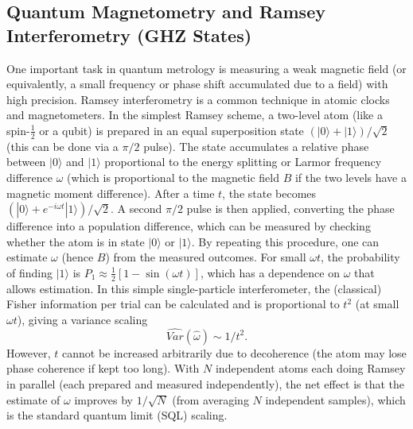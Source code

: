 \subsection{Quantum Magnetometry and Ramsey Interferometry (GHZ States)}

\label{sec:GHZ-Ramsey}



One important task in quantum metrology is measuring a weak magnetic
field (or equivalently, a small frequency or phase shift accumulated
due to a field) with high precision. Ramsey interferometry is a common
technique in atomic clocks and magnetometers. In the simplest Ramsey
scheme, a two-level atom (like a spin-$\frac{1}{2}$ or a qubit) is
prepared in an equal superposition state $(|0\rangle +
|1\rangle)/\sqrt{2}$ (this can be done via a $\pi/2$ pulse). The state
accumulates a relative phase between $|0\rangle$ and $|1\rangle$
proportional to the energy splitting or Larmor frequency difference
$\omega$ (which is proportional to the magnetic field $B$ if the two
levels have a magnetic moment difference). After a time $t$, the state
becomes $(|0\rangle + e^{-i\omega t}|1\rangle)/\sqrt{2}$. A second
$\pi/2$ pulse is then applied, converting the phase difference into a
population difference, which can be measured by checking whether the
atom is in state $|0\rangle$ or $|1\rangle$. By repeating this
procedure, one can estimate $\omega$ (hence $B$) from the measured
outcomes. For small $\omega t$, the probability of finding $|1\rangle$
is $P_1 \approx \frac{1}{2}[1 - \sin(\omega t)]$, which has a
dependence on $\omega$ that allows estimation. In this simple
single-particle interferometer, the (classical) Fisher information per
trial can be calculated and is proportional to $t^2$ (at small $\omega
t$), giving a variance scaling
\[
\widehat{Var}(\hat{\omega}) \sim 1/t^2.
\]
However, $t$ cannot be increased arbitrarily due to
decoherence (the atom may lose phase coherence if kept too long). With
$N$ independent atoms each doing Ramsey in parallel (each prepared and
measured independently), the net effect is that the estimate of
$\omega$ improves by $1/\sqrt{N}$ (from averaging $N$ independent
samples), which is the standard quantum limit (SQL) scaling.



